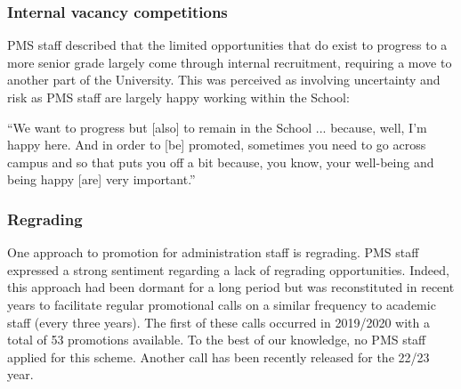 
\subsubsection{Internal vacancy competitions}
PMS staff described that the limited opportunities that do exist to progress to a more senior grade largely come through internal recruitment, requiring a move to another part of the University.  This was perceived as involving uncertainty and risk as PMS staff are largely happy working within the School: 


\begin{myquote}
    ``We want to progress but [also] to remain in the School ... because, well, I'm happy here.  And in order to [be] promoted, sometimes you need to go across campus and so that puts you off a bit because, you know, your well-being and being happy [are] very important.''
\end{myquote}


\subsubsection{Regrading}
One approach to promotion for administration staff is regrading. 
PMS staff expressed a strong sentiment regarding a lack of regrading opportunities. 
Indeed, this approach had been dormant for a long period but was reconstituted in recent years to facilitate regular promotional calls on a similar frequency to academic staff (every three years). The first of these calls occurred in 2019/2020 with a total of 53 promotions available. To the best of our knowledge, no PMS staff applied for this scheme. Another call has been recently released for the 22/23 year. 

